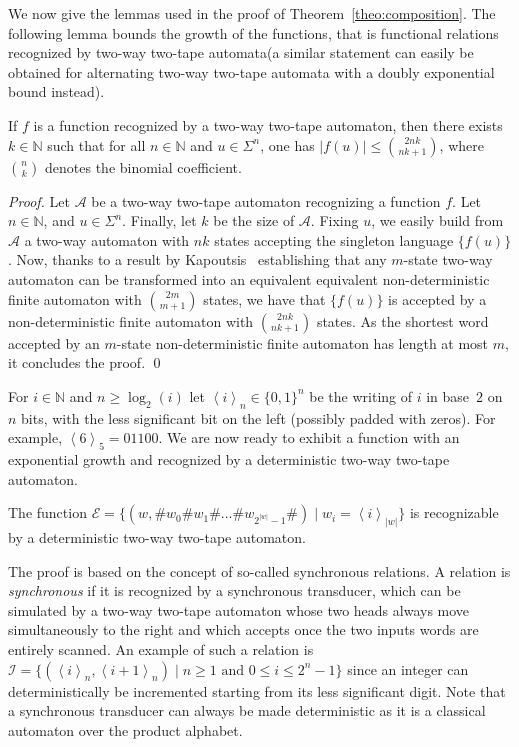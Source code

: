 \documentclass[runningheads, envcountsame, a4paper]{llncs}
\newcommand*{\N}{\mathbb{N}}
\newcommand*{\frel}{f}
\newcommand*{\base}[3][]{\left\langle {#3} \right\rangle_{#1}}
\newcommand*{\size}[1]{\left| #1 \right|}
\newcommand*{\alphabet}{\Sigma}
\newcommand*{\atm}{\mathcal{A}}
\newcommand*{\model}{two-way two-tape automaton\xspace}
\renewcommand*{\models}{two-way two-tape automata\xspace}
\newcommand*{\dmodel}{deterministic two-way two-tape automaton\xspace}
\newcommand*{\omodel}{two-way automaton\xspace}
\newcommand*{\amodels}{alternating two-way two-tape automata\xspace}
\newcommand*{\nfa}{non-deterministic finite automaton\xspace}
\newcommand*{\enum}{\mathcal{E}}
\newcommand*{\incrementS}{\mathcal{I}}
\begin{document}
We now give the lemmas used in the proof of Theorem~\ref{theo:composition}.
The following lemma bounds the growth of the functions, that is functional
relations recognized by \models (a similar statement can easily be obtained
for \amodels with a doubly exponential bound instead).

\begin{lemma}  \label{boundFuncs}
  If $\frel$ is a function recognized by a \model, then there
  exists $k \in \N$ such that for all $n \in \N$ and $ u \in \alphabet^n$,
  one has $\size{\frel(u)} \leq \binom{2nk}{nk + 1}$, where $\binom{n}{k}$
  denotes the binomial coefficient.
\end{lemma}

\begin{proof}
  Let $\atm$ be a \model recognizing a function $\frel$. Let $n
  \in \N$, and $u \in \alphabet^n$. Finally, let $k$ be the size of $\atm$.
  Fixing $u$, we easily build from $\atm$ a \omodel with $nk$ states
  accepting the singleton language $\{\frel(u)\}$.  Now, thanks to a result
  by Kapoutsis~\cite{Kapoutsis05} establishing that any $m$-state \omodel
  can be transformed into an equivalent equivalent \nfa with
  $\binom{2m}{m+1}$ states, we have that $\{\frel(u)\}$ is accepted by a
  \nfa with $\binom{2nk}{nk+1}$ states. As the shortest word accepted by an
  $m$-state \nfa has length at most $m$, it concludes the proof.
\qed\end{proof}

For $i \in \N$ and $n \geq \log_2(i)$ let $\base[n]{2}{i} \in \{0,1\}^n$ be
the writing of $i$ in base~$2$ on~$n$ bits, with the less significant bit
on the left (possibly padded with zeros). For example, $\base[5]{2}{6} =
01100$. We are now ready to exhibit a function with an exponential growth
and recognized by a \dmodel.

\begin{lemma}  \label{counting}
  The function $\enum = \{(w, \#w_0\#w_1\#\ldots\#w_{2^{\size{w}} - 1}\#)
  \mid w_i = \base[\size{w}]{2}{i}\}$ is recognizable by a \dmodel.
\end{lemma}

The proof is based on the concept of so-called synchronous relations. A
relation is \emph{synchronous} if it is recognized by a synchronous
transducer, which can be simulated by a \model whose two heads always move
simultaneously to the right and which accepts once the two inputs words are
entirely scanned. An example of such a relation is $\incrementS =
\{(\base[n]{2}{i},\base[n]{2}{i+1})\mid n\geq 1 \text{ and } 0\leq i\leq
2^n-1\}$ since an integer can deterministically be incremented starting
from its less significant digit.  Note that a synchronous transducer can
always be made deterministic as it is a classical automaton over the
product alphabet.
\end{document}
